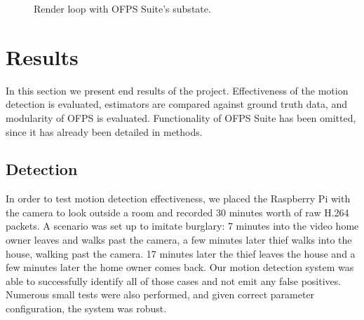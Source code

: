 \documentclass[11pt,english]{report}
\begin{document}
\begin{figure}[!ht]
	\centering
	\caption{\centering Render loop with OFPS Suite's substate.}
\end{figure}


\chapter{Results}

In this section we present end results of the project. Effectiveness of the motion detection is evaluated, estimators are compared against ground truth data, and modularity of OFPS is evaluated. Functionality of OFPS Suite has been omitted, since it has already been detailed in methods.

\section{Detection}

In order to test motion detection effectiveness, we placed the Raspberry Pi with the camera to look outside a room and recorded 30 minutes worth of raw H.264 packets. A scenario was set up to imitate burglary: 7 minutes into the video home owner leaves and walks past the camera, a few minutes later thief walks into the house, walking past the camera. 17 minutes later the thief leaves the house and a few minutes later the home owner comes back. Our motion detection system was able to successfully identify all of those cases and not emit any false positives. Numerous small tests were also performed, and given correct parameter configuration, the system was robust.
\end{document}
